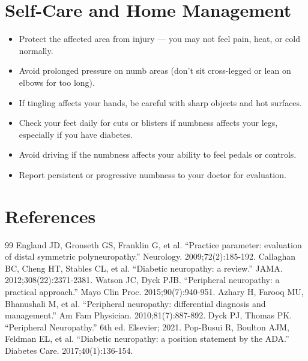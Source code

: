 \section*{Self-Care and Home Management}
\begin{itemize}
  \item Protect the affected area from injury — you may not feel pain, heat, or cold normally.
  \item Avoid prolonged pressure on numb areas (don't sit cross-legged or lean on elbows for too long).
  \item If tingling affects your hands, be careful with sharp objects and hot surfaces.
  \item Check your feet daily for cuts or blisters if numbness affects your legs, especially if you have diabetes.
  \item Avoid driving if the numbness affects your ability to feel pedals or controls.
  \item Report persistent or progressive numbness to your doctor for evaluation.
\end{itemize}

\section*{References}
\begin{thebibliography}{99}
 England JD, Gronseth GS, Franklin G, et al. ``Practice parameter: evaluation of distal symmetric polyneuropathy.'' Neurology. 2009;72(2):185-192.
 Callaghan BC, Cheng HT, Stables CL, et al. ``Diabetic neuropathy: a review.'' JAMA. 2012;308(22):2371-2381.
 Watson JC, Dyck PJB. ``Peripheral neuropathy: a practical approach.'' Mayo Clin Proc. 2015;90(7):940-951.
 Azhary H, Farooq MU, Bhanushali M, et al. ``Peripheral neuropathy: differential diagnosis and management.'' Am Fam Physician. 2010;81(7):887-892.
 Dyck PJ, Thomas PK. ``Peripheral Neuropathy.'' 6th ed. Elsevier; 2021.
 Pop-Busui R, Boulton AJM, Feldman EL, et al. ``Diabetic neuropathy: a position statement by the ADA.'' Diabetes Care. 2017;40(1):136-154.
\end{thebibliography}
